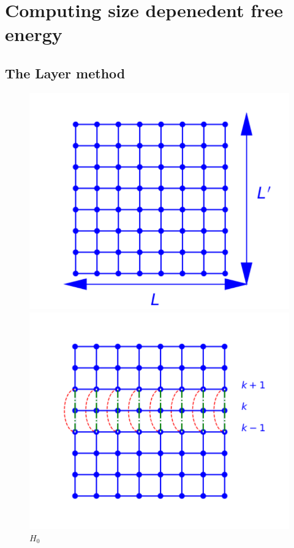     \section{Computing size depenedent free energy}

    \subsection{The Layer method}

\begin{figure}
	\begin{minipage}[t]{0.32\linewidth}
		\includegraphics[width=\linewidth]{numerical/cross-h0.pdf}
		\caption*{$H_0$}
	\end{minipage}
	\begin{minipage}[t]{0.32\linewidth}
		\includegraphics[width=\linewidth]{numerical/cross-hlambda.pdf}

\end{minipage}
\end{figure}
